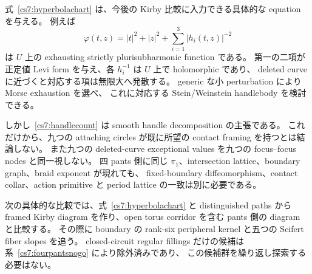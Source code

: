 式~\eqref{cs7:hyperbolachart} は、今後の Kirby 比較に入力できる具体的な equation を与える。
例えば
\[
 \varphi(t,z)=|t|^2+|z|^2+\sum_{i=1}^3|h_i(t,z)|^{-2}
\]
は $U$ 上の exhausting strictly plurisubharmonic function である。
第一の二項が正定値 Levi form を与え、各 $h_i^{-1}$ は $U$ 上で holomorphic であり、
deleted curve に近づくと対応する項は無限大へ発散する。
generic な小 perturbation により Morse exhaustion を選べ、
これに対応する Stein/Weinstein handlebody を検討できる。

しかし~\eqref{cs7:handlecount} は smooth handle decomposition の主張である。
これだけから、九つの attaching circles が既に所望の contact framing を持つとは結論しない。
また九つの deleted-curve exceptional values を九つの focus--focus nodes と同一視しない。
四 pants 側に同じ $\pi_1$、intersection lattice、boundary graph、braid exponent が現れても、
fixed-boundary diffeomorphism、contact collar、action primitive と period lattice の一致は別に必要である。

次の具体的な比較では、式~\eqref{cs7:hyperbolachart} と distinguished paths から
framed Kirby diagram を作り、open torus corridor を含む pants 側の diagram と比較する。
その際に boundary の rank-six peripheral kernel と五つの Seifert fiber slopes を追う。
closed-circuit regular fillings だけの候補は系~\ref{cs7:fourpantsnogo} により除外済みであり、
この候補群を繰り返し探索する必要はない。
